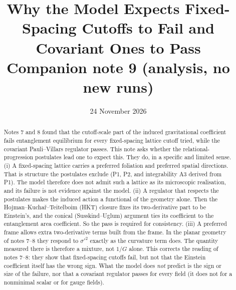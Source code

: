\documentclass[11pt]{article}
\title{Why the Model Expects Fixed-Spacing Cutoffs to Fail and Covariant Ones to Pass\\[4pt]\large Companion note 9 (analysis, no new runs)}
\author{}\date{24 November 2026}
\begin{document}
\maketitle
\begin{abstract}
Notes 7 and 8 found that the cutoff-scale part of the induced gravitational coefficient fails entanglement equilibrium for every fixed-spacing lattice cutoff tried, while the covariant Pauli--Villars regulator passes. This note asks whether the relational-progression postulates lead one to expect this. They do, in a specific and limited sense. (i) A fixed-spacing lattice carries a preferred foliation and preferred spatial directions. That is structure the postulates exclude (P1, P2, and integrability A3 derived from P1). The model therefore does not admit such a lattice as its microscopic realisation, and its failure is not evidence against the model. (ii) A regulator that respects the postulates makes the induced action a functional of the geometry alone. Then the Hojman--Kucha\v{r}--Teitelboim (HKT) closure fixes its two-derivative part to be Einstein's, and the conical (Susskind--Uglum) argument ties its coefficient to the entanglement area coefficient. So the pass is required for consistency. (iii) A preferred frame allows extra two-derivative terms built from the frame. In the planar geometry of notes 7--8 they respond to $\sigma'^2$ exactly as the curvature term does. The quantity measured there is therefore a mixture, not $1/G$ alone. This corrects the reading of notes 7--8: they show that fixed-spacing cutoffs fail, but not that the Einstein coefficient itself has the wrong sign. What the model does \emph{not} predict is the sign or size of the failure, nor that a covariant regulator passes for every field (it does not for a nonminimal scalar or for gauge fields).
\end{abstract}
\end{document}
